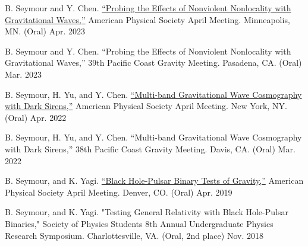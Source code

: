 \begin{cvpresentationsmod}

    \cvpresentation
    {B. Seymour and Y. Chen. \href{https://meetings.aps.org/Meeting/APR23/Session/C08.9}{“Probing the Effects of Nonviolent Nonlocality with Gravitational Waves,”} American Physical Society April Meeting. Minneapolis, MN. (Oral)}
    {Apr. 2023}
    

    \cvpresentation
    {B. Seymour and Y. Chen. “Probing the Effects of Nonviolent Nonlocality with Gravitational Waves,” 39th Pacific Coast Gravity Meeting. Pasadena, CA. (Oral)}
    {Mar. 2023}


    \cvpresentation
    {B. Seymour, H. Yu, and Y. Chen. \href{https://meetings.aps.org/Meeting/APR22/Session/Q16.7}{“Multi-band Gravitational Wave Cosmography with Dark Sirens,”} American Physical Society April Meeting. New York, NY. (Oral)}
    {Apr. 2022}
    

    \cvpresentation
    {B. Seymour, H. Yu, and Y. Chen. “Multi-band Gravitational Wave Cosmography with Dark Sirens,” 38th Pacific Coast Gravity Meeting. Davis, CA. (Oral)}
    {Mar. 2022}


    \cvpresentation
    {B. Seymour, and K. Yagi. \href{https://meetings.aps.org/Meeting/APR19/Session/D16.7}{“Black Hole-Pulsar Binary Tests of Gravity,”} American Physical Society April Meeting. Denver, CO. (Oral)}
    {Apr. 2019}
    
  \cvpresentation
    {B. Seymour, and K. Yagi. "Testing General Relativity with Black Hole-Pulsar Binaries," Society of Physics Students 8th Annual Undergraduate Physics Research Symposium. Charlottesville, VA. (Oral, 2nd place)} %
    {Nov. 2018 } %
    
    




\end{cvpresentationsmod}
